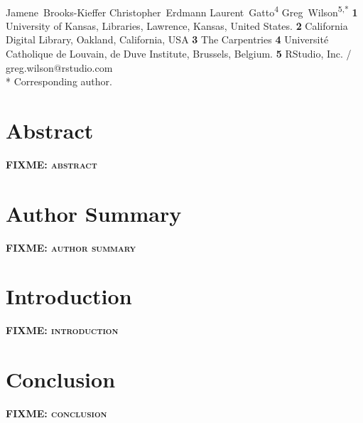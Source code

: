 \documentclass[10pt,letterpaper]{article}
\newcommand{\fixme}[1]{\textsc{\textbf{FIXME: {#1}}}}
\begin{document}
\vspace*{0.2in}

\begin{flushleft}
{\Large
\textbf{}
}
\newline
\\
{Jamene~Brooks-Kieffer}
{Christopher~Erdmann}
{Laurent~Gatto}\textsuperscript{4}
{Greg~Wilson}\textsuperscript{5,*}
\textbf{1} University of Kansas, Libraries, Lawrence, Kansas, United States.
\textbf{2} California Digital Library, Oakland, California, USA
\textbf{3} The Carpentries
\textbf{4} Université Catholique de Louvain, de Duve Institute, Brussels, Belgium.
\textbf{5} RStudio, Inc. / greg.wilson@rstudio.com
\\
\bigskip
* Corresponding author.
\end{flushleft}

\section*{Abstract}

\fixme{abstract}

\section*{Author Summary}

\fixme{author summary}

\section*{Introduction}

\fixme{introduction}

\section*{Conclusion}

\fixme{conclusion}

\nocite{*} %

\end{document}

